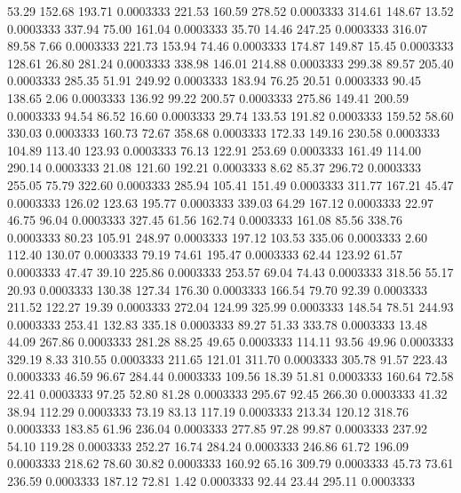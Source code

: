   53.29  152.68  193.71   0.0003333
 221.53  160.59  278.52   0.0003333
 314.61  148.67   13.52   0.0003333
 337.94   75.00  161.04   0.0003333
  35.70   14.46  247.25   0.0003333
 316.07   89.58    7.66   0.0003333
 221.73  153.94   74.46   0.0003333
 174.87  149.87   15.45   0.0003333
 128.61   26.80  281.24   0.0003333
 338.98  146.01  214.88   0.0003333
 299.38   89.57  205.40   0.0003333
 285.35   51.91  249.92   0.0003333
 183.94   76.25   20.51   0.0003333
  90.45  138.65    2.06   0.0003333
 136.92   99.22  200.57   0.0003333
 275.86  149.41  200.59   0.0003333
  94.54   86.52   16.60   0.0003333
  29.74  133.53  191.82   0.0003333
 159.52   58.60  330.03   0.0003333
 160.73   72.67  358.68   0.0003333
 172.33  149.16  230.58   0.0003333
 104.89  113.40  123.93   0.0003333
  76.13  122.91  253.69   0.0003333
 161.49  114.00  290.14   0.0003333
  21.08  121.60  192.21   0.0003333
   8.62   85.37  296.72   0.0003333
 255.05   75.79  322.60   0.0003333
 285.94  105.41  151.49   0.0003333
 311.77  167.21   45.47   0.0003333
 126.02  123.63  195.77   0.0003333
 339.03   64.29  167.12   0.0003333
  22.97   46.75   96.04   0.0003333
 327.45   61.56  162.74   0.0003333
 161.08   85.56  338.76   0.0003333
  80.23  105.91  248.97   0.0003333
 197.12  103.53  335.06   0.0003333
   2.60  112.40  130.07   0.0003333
  79.19   74.61  195.47   0.0003333
  62.44  123.92   61.57   0.0003333
  47.47   39.10  225.86   0.0003333
 253.57   69.04   74.43   0.0003333
 318.56   55.17   20.93   0.0003333
 130.38  127.34  176.30   0.0003333
 166.54   79.70   92.39   0.0003333
 211.52  122.27   19.39   0.0003333
 272.04  124.99  325.99   0.0003333
 148.54   78.51  244.93   0.0003333
 253.41  132.83  335.18   0.0003333
  89.27   51.33  333.78   0.0003333
  13.48   44.09  267.86   0.0003333
 281.28   88.25   49.65   0.0003333
 114.11   93.56   49.96   0.0003333
 329.19    8.33  310.55   0.0003333
 211.65  121.01  311.70   0.0003333
 305.78   91.57  223.43   0.0003333
  46.59   96.67  284.44   0.0003333
 109.56   18.39   51.81   0.0003333
 160.64   72.58   22.41   0.0003333
  97.25   52.80   81.28   0.0003333
 295.67   92.45  266.30   0.0003333
  41.32   38.94  112.29   0.0003333
  73.19   83.13  117.19   0.0003333
 213.34  120.12  318.76   0.0003333
 183.85   61.96  236.04   0.0003333
 277.85   97.28   99.87   0.0003333
 237.92   54.10  119.28   0.0003333
 252.27   16.74  284.24   0.0003333
 246.86   61.72  196.09   0.0003333
 218.62   78.60   30.82   0.0003333
 160.92   65.16  309.79   0.0003333
  45.73   73.61  236.59   0.0003333
 187.12   72.81    1.42   0.0003333
  92.44   23.44  295.11   0.0003333
